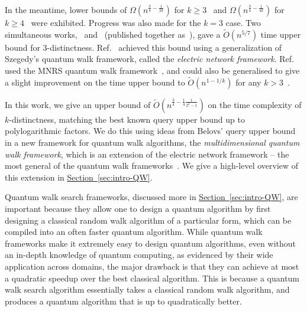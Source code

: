 \documentclass{article}
\renewcommand{\sec}[1]{\hyperref[sec:#1]{Section~\ref*{sec:#1}}}
\renewcommand{\>}{\rangle}
\newcommand{\<}{\langle}
\renewcommand{\(}{\left(}
\renewcommand{\)}{\right)}
\begin{document}
In the meantime, lower bounds of $\Omega(n^{\frac{3}{4}-\frac{1}{2k}})$ for $k\geq 3$~\cite{bun2018PolyMethodStrikesBack} and $\Omega(n^{\frac{3}{4}-\frac{1}{4k}})$ for $k\geq 4$~\cite{mande2020kDistLB} were exhibited. Progress was also made for the $k=3$ case. Two simultaneous works,~\cite{belovs2013ElectricWalks} and~\cite{childs2013arXivTimeEfficientQW3Distintness} (published together as~\cite{belovs2013TimeEfficientQW3Distintness}),
gave a $\widetilde{O}(n^{5/7})$ time upper bound for 3-distinctness. Ref.~\cite{belovs2013ElectricWalks} achieved this bound using a generalization of Szegedy's quantum walk framework, called the \emph{electric network framework}. Ref.~\cite{childs2013arXivTimeEfficientQW3Distintness} used the MNRS quantum walk framework~\cite{magniez2006SearchQuantumWalk}, and could also be generalised to give a slight improvement on the time upper bound to $\widetilde{O}(n^{1-1/k})$ for any $k>3$~\cite{jeffery2014thesis}. 

In this work, we give an upper bound of $\widetilde{O}(n^{\frac{3}{4}-\frac{1}{4}\frac{1}{2^k-1}})$ on the time complexity of $k$-distinctness, matching the best known query upper bound up to polylogarithmic factors. We do this using ideas from Belovs' query upper bound in a new framework for quantum walk algorithms, the \emph{multidimensional quantum walk framework}, which is an extension of the electric network framework -- the most general of the quantum walk frameworks~\cite{apers2019UnifiedFrameworkQWSearch}. We give a high-level overview of this extension in \sec{intro-QW}. 

Quantum walk search frameworks, discussed more in \sec{intro-QW}, are important because they allow one to design a quantum algorithm by first designing a classical random walk algorithm of a particular form, which can be compiled into an often faster quantum algorithm.  
While quantum walk frameworks make it extremely easy to design quantum algorithms, even without an in-depth knowledge of quantum computing, as evidenced by their wide application across domains, the major drawback is that they can achieve at most a quadratic speedup over the best classical algorithm. This is because a quantum walk search algorithm essentially takes a classical random walk algorithm, and produces a quantum algorithm that is up to quadratically better. 
\end{document}
